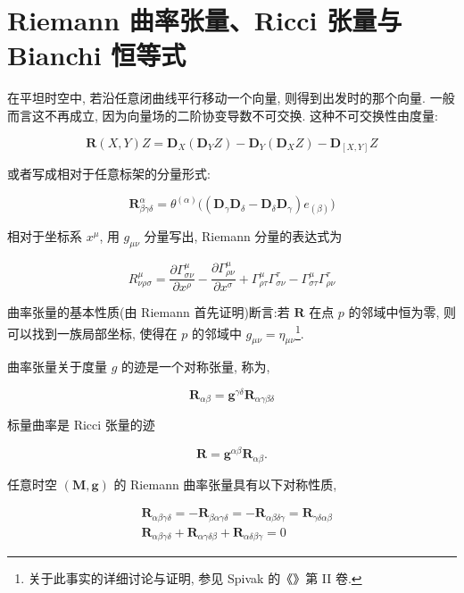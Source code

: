 \section{Riemann 曲率张量、Ricci 张量与 Bianchi 恒等式}

在平坦时空中, 若沿任意闭曲线平行移动一个向量, 则得到出发时的那个向量. 一般而言这不再成立, 因为向量场的二阶协变导数不可交换. 这种不可交换性由度量:

\begin{equation}
\mathbf{R}(X, Y)Z = \mathbf{D}_{X}(\mathbf{D}_{Y}Z) - \mathbf{D}_{Y}(\mathbf{D}_{X}Z) - \mathbf{D}_{[X, Y]}Z\label{eq:cA-410}
\end{equation}

或者写成相对于任意标架的分量形式:

\begin{equation}
\mathbf{R}^{\alpha}_{\beta\gamma\delta} = \theta^{(\alpha)}\big((\mathbf{D}_{\gamma}\mathbf{D}_{\delta} - \mathbf{D}_{\delta}\mathbf{D}_{\gamma})e_{(\beta)}\big)\label{eq:cA-411}
\end{equation}

相对于坐标系 $x^{\mu}$, 用 $g_{\mu\nu}$ 分量写出, Riemann 分量的表达式为

\begin{equation}
R^{\mu}_{\nu\rho\sigma} = \frac{\partial\Gamma^{\mu}_{\sigma\nu}}{\partial x^{\rho}} - \frac{\partial\Gamma^{\mu}_{\rho\nu}}{\partial x^{\sigma}} + \Gamma^{\mu}_{\rho\tau}\Gamma^{\tau}_{\sigma\nu} - \Gamma^{\mu}_{\sigma\tau}\Gamma^{\tau}_{\rho\nu}\label{eq:cA-412}
\end{equation}

曲率张量的基本性质(由 Riemann 首先证明)断言:若 $\mathbf{R}$ 在点 $p$ 的邻域中恒为零, 则可以找到一族局部坐标, 使得在 $p$ 的邻域中 $g_{\mu\nu} = \eta_{\mu\nu}$\footnote{关于此事实的详细讨论与证明, 参见 Spivak 的《\cite{sp}》第 II 卷.}.

曲率张量关于度量 $g$ 的迹是一个对称张量, 称为,

\[
\mathbf{R}_{\alpha\beta} = \mathbf{g}^{\gamma\delta}\mathbf{R}_{\alpha\gamma\beta\delta}
\]

标量曲率是 Ricci 张量的迹

\[
\mathbf{R} = \mathbf{g}^{\alpha\beta}\mathbf{R}_{\alpha\beta}.
\]

任意时空 $(\mathbf{M}, \mathbf{g})$ 的 Riemann 曲率张量具有以下对称性质,

\begin{equation}
\begin{aligned}
& \mathbf{R}_{\alpha\beta\gamma\delta} = -\mathbf{R}_{\beta\alpha\gamma\delta} = -\mathbf{R}_{\alpha\beta\delta\gamma} = \mathbf{R}_{\gamma\delta\alpha\beta} \\
& \mathbf{R}_{\alpha\beta\gamma\delta} + \mathbf{R}_{\alpha\gamma\delta\beta} + \mathbf{R}_{\alpha\delta\beta\gamma} = 0
\end{aligned}\label{eq:cA-413}
\end{equation}

